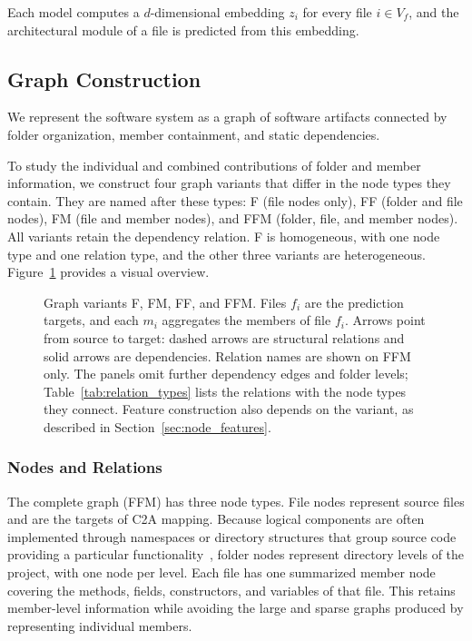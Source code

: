 Each model computes a $d$-dimensional embedding $z_i$ for every file $i \in V_f$, and the architectural module of a file is predicted from this embedding.

\subsection{Graph Construction\label{sec:het_graph}\label{sec:graph_variants}}
We represent the software system as a graph of software artifacts connected by folder organization, member containment, and static dependencies.

To study the individual and combined contributions of folder and member information, we construct four graph variants that differ in the node types they contain. They are named after these types: F (file nodes only), FF (folder and file nodes), FM (file and member nodes), and FFM (folder, file, and member nodes). All variants retain the dependency relation. F is homogeneous, with one node type and one relation type, and the other three variants are heterogeneous. Figure~\ref{fig:graph_variants_overview} provides a visual overview.
 
\begin{figure}[h]
\centering
\resizebox{0.96\linewidth}{!}{}
\caption{Graph variants F, FM, FF, and FFM. Files $f_i$ are the prediction targets, and each $m_i$ aggregates the members of file $f_i$. Arrows point from source to target: dashed arrows are structural relations and solid arrows are dependencies. Relation names are shown on FFM only. The panels omit further dependency edges and folder levels; Table~\ref{tab:relation_types} lists the relations with the node types they connect. Feature construction also depends on the variant, as described in Section~\ref{sec:node_features}.}
\label{fig:graph_variants_overview}
\end{figure}

\subsubsection{Nodes and Relations}
The complete graph (FFM) has three node types. File nodes represent source files and are the targets of C2A mapping. Because logical components are often implemented through namespaces or directory structures that group source code providing a particular functionality~\cite{fundamentals_sa, garcia2013}, folder nodes represent directory levels of the project, with one node per level. Each file has one summarized member node covering the methods, fields, constructors, and variables of that file. This retains member-level information while avoiding the large and sparse graphs produced by representing individual members.

